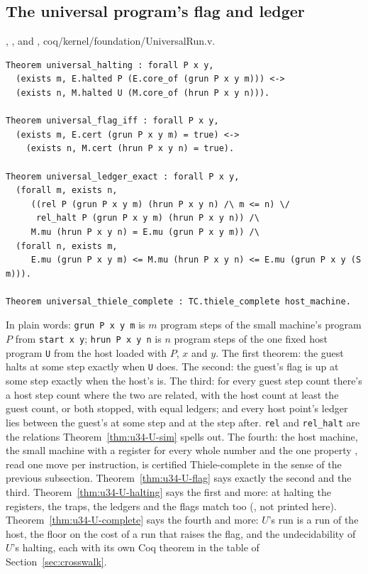 \subsection{The universal program's flag and ledger}

{\raggedright {}, ,  and , coq/kernel/foundation/UniversalRun.v.\par}

{\scriptsize
\begin{verbatim}
Theorem universal_halting : forall P x y,
  (exists m, E.halted P (E.core_of (grun P x y m))) <->
  (exists n, M.halted U (M.core_of (hrun P x y n))).

Theorem universal_flag_iff : forall P x y,
  (exists m, E.cert (grun P x y m) = true) <->
    (exists n, M.cert (hrun P x y n) = true).

Theorem universal_ledger_exact : forall P x y,
  (forall m, exists n,
     ((rel P (grun P x y m) (hrun P x y n) /\ m <= n) \/
      rel_halt P (grun P x y m) (hrun P x y n)) /\
     M.mu (hrun P x y n) = E.mu (grun P x y m)) /\
  (forall n, exists m,
     E.mu (grun P x y m) <= M.mu (hrun P x y n) <= E.mu (grun P x y (S m))).

Theorem universal_thiele_complete : TC.thiele_complete host_machine.
\end{verbatim}}

In plain words: \texttt{grun P x y m} is $m$ program steps of the small machine's program
$P$ from \texttt{start x y}; \texttt{hrun P x y n} is $n$ program steps of the one fixed host
program \texttt{U} from the host loaded with $P$, $x$ and $y$. The first theorem: the
guest halts at some step exactly when \texttt{U} does. The second: the guest's flag is up at some
step exactly when the host's is. The third: for every guest step count there's a host step count
where the two are related,
with the host count at least the guest count, or both stopped, with equal ledgers; and every host point's ledger lies
between the guest's at some step and at the step after. \texttt{rel} and \texttt{rel\_halt} are the
relations Theorem~\ref{thm:u34-U-sim} spells out. The fourth: the host machine, the small machine
with a register for every whole number and the one property \code{PSlot}, read one move per
instruction, is certified Thiele-complete in the sense of the previous subsection.
Theorem~\ref{thm:u34-U-flag} says exactly the second and the third. Theorem~\ref{thm:u34-U-halting}
says the first and more: at halting the registers, the traps, the ledgers and the flags match too
(\code{universal\_output}, not printed here). Theorem~\ref{thm:u34-U-complete} says the fourth
and more: $U$'s run is a run of the host, the floor on the cost of a run that raises the flag, and the
undecidability of $U$'s halting, each with its own Coq theorem in the table of
Section~\ref{sec:crosswalk}.


